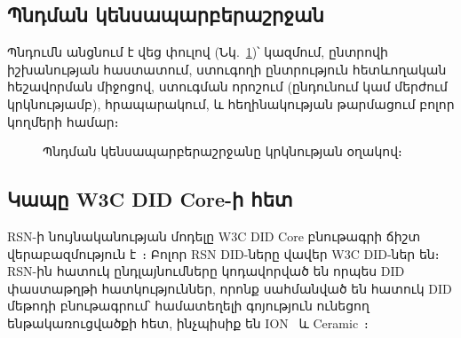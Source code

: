 \documentclass[11pt,a4paper,twocolumn]{article}
\begin{document}
\subsection{Պնդման կենսապարբերաշրջան}

Պնդումն անցնում է վեց փուլով (Նկ.~\ref{fig:lifecycle})՝ կազմում, ընտրովի իշխանության հաստատում, ստուգողի ընտրություն հետևողական հեշավորման միջոցով, ստուգման որոշում (ընդունում կամ մերժում կրկնությամբ), հրապարակում, և հեղինակության թարմացում բոլոր կողմերի համար։

\begin{figure}[ht]
\centering
{}
\caption{Պնդման կենսապարբերաշրջանը կրկնության օղակով։}
\label{fig:lifecycle}
\end{figure}

\subsection{Կապը W3C DID Core-ի հետ}

RSN-ի նույնականության մոդելը W3C DID Core բնութագրի ճիշտ վերաբազմություն է~\cite{did2022}։ Բոլոր RSN DID-ները վավեր W3C DID-ներ են։ RSN-ին հատուկ ընդլայնումները կոդավորված են որպես DID փաստաթղթի հատկություններ, որոնք սահմանված են հատուկ DID մեթոդի բնութագրում՝ համատեղելի գոյություն ունեցող ենթակառուցվածքի հետ, ինչպիսիք են ION~\cite{buchner2021} և Ceramic~\cite{ceramic2023}։

\end{document}
